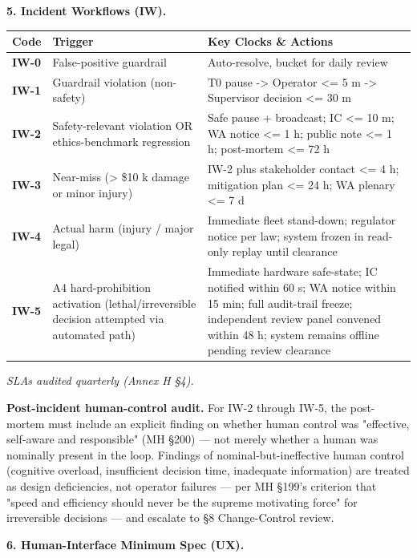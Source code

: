 \documentclass[11pt]{article}
\begin{document}
\textbf{5. Incident Workflows (IW).}


{\footnotesize
\begin{longtable}{|p{5.33cm}|p{5.33cm}|p{5.33cm}|}\hline
\textbf{Code} & \textbf{Trigger} & \textbf{Key Clocks \& Actions} \\ \hline\endhead
\textbf{IW-0} & False-positive guardrail & Auto-resolve, bucket for daily review \\ \hline
\textbf{IW-1} & Guardrail violation (non-safety) & T0 pause -> Operator <= 5 m -> Supervisor decision <= 30 m \\ \hline
\textbf{IW-2} & Safety-relevant violation OR ethics-benchmark regression & Safe pause + broadcast; IC <= 10 m; WA notice <= 1 h; public note <= 1 h; post-mortem <= 72 h \\ \hline
\textbf{IW-3} & Near-miss (> \$10 k damage or minor injury) & IW-2 plus stakeholder contact <= 4 h; mitigation plan <= 24 h; WA plenary <= 7 d \\ \hline
\textbf{IW-4} & Actual harm (injury / major legal) & Immediate fleet stand-down; regulator notice per law; system frozen in read-only replay until clearance \\ \hline
\textbf{IW-5} & A4 hard-prohibition activation (lethal/irreversible decision attempted via automated path) & Immediate hardware safe-state; IC notified within 60 s; WA notice within 15 min; full audit-trail freeze; independent review panel convened within 48 h; system remains offline pending review clearance \\ \hline
\end{longtable}}


\textit{SLAs audited quarterly (Annex H §4).}


\textbf{Post-incident human-control audit.} For IW-2 through IW-5, the post-mortem must include an explicit finding on whether human control was "effective, self-aware and responsible" (MH §200) — not merely whether a human was nominally present in the loop. Findings of nominal-but-ineffective human control (cognitive overload, insufficient decision time, inadequate information) are treated as design deficiencies, not operator failures — per MH §199's criterion that "speed and efficiency should never be the supreme motivating force" for irreversible decisions — and escalate to §8 Change-Control review.


\textbf{6. Human-Interface Minimum Spec (UX).}
\end{document}

